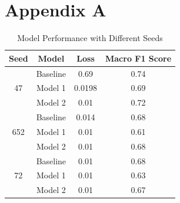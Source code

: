 \documentclass[11pt]{article}
\begin{document}
\section{Appendix A}
\label{sec:results}
\begin{table}[ht]
\centering
\begin{tabular}{|c|c|c|c|}
\hline
\textbf{Seed} & \textbf{Model} & \textbf{Loss} & \textbf{Macro F1 Score} \\ \hline
\multirow{3}{*}{47} & Baseline & 0.69 & 0.74 \\
 & Model 1 & 0.0198 & 0.69 \\
 & Model 2 & 0.01 & 0.72 \\ \hline
\multirow{3}{*}{652} & Baseline & 0.014 & 0.68 \\
 & Model 1 & 0.01 & 0.61 \\
 & Model 2 & 0.01 & 0.68 \\ \hline
\multirow{3}{*}{72} & Baseline & 0.01 & 0.68 \\
 & Model 1 & 0.01 & 0.63 \\
 & Model 2 & 0.01 & 0.67 \\ \hline
\end{tabular}
\caption{Model Performance with Different Seeds}
\label{table:results}
\end{table}
\end{document}
